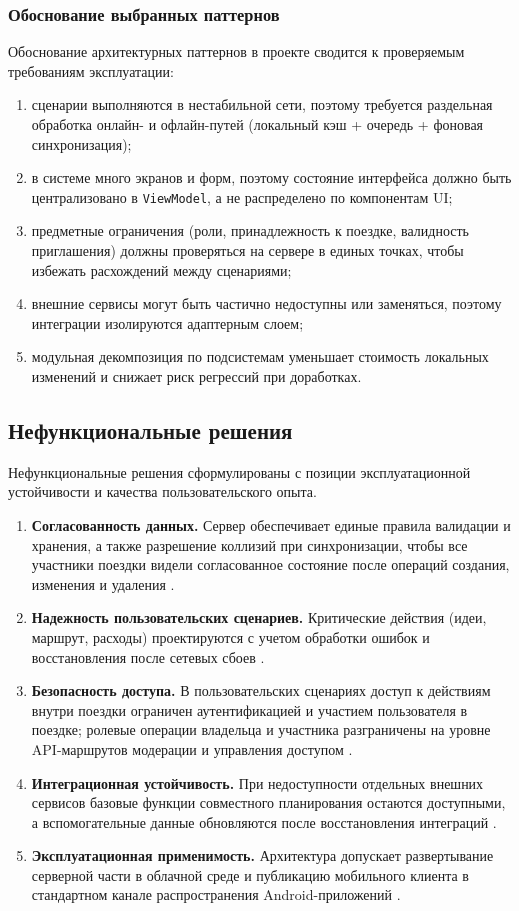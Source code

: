 \subsubsection{Обоснование выбранных паттернов}
Обоснование архитектурных паттернов в проекте сводится к проверяемым требованиям эксплуатации:
\begin{enumerate}
    \item сценарии выполняются в нестабильной сети, поэтому требуется раздельная обработка онлайн- и офлайн-путей (локальный кэш + очередь + фоновая синхронизация);
    \item в системе много экранов и форм, поэтому состояние интерфейса должно быть централизовано в \texttt{ViewModel}, а не распределено по компонентам UI;
    \item предметные ограничения (роли, принадлежность к поездке, валидность приглашения) должны проверяться на сервере в единых точках, чтобы избежать расхождений между сценариями;
    \item внешние сервисы могут быть частично недоступны или заменяться, поэтому интеграции изолируются адаптерным слоем;
    \item модульная декомпозиция по подсистемам уменьшает стоимость локальных изменений и снижает риск регрессий при доработках.
\end{enumerate}

\subsection{Нефункциональные решения}
Нефункциональные решения сформулированы с позиции эксплуатационной устойчивости и качества пользовательского опыта.

\begin{enumerate}
    \item \textbf{Согласованность данных.} Сервер обеспечивает единые правила валидации и хранения, а также разрешение коллизий при синхронизации, чтобы все участники поездки видели согласованное состояние после операций создания, изменения и удаления .
    \item \textbf{Надежность пользовательских сценариев.} Критические действия (идеи, маршрут, расходы) проектируются с учетом обработки ошибок и восстановления после сетевых сбоев .
    \item \textbf{Безопасность доступа.} В пользовательских сценариях доступ к действиям внутри поездки ограничен аутентификацией и участием пользователя в поездке; ролевые операции владельца и участника разграничены на уровне API-маршрутов модерации и управления доступом .
    \item \textbf{Интеграционная устойчивость.} При недоступности отдельных внешних сервисов базовые функции совместного планирования остаются доступными, а вспомогательные данные обновляются после восстановления интеграций .
    \item \textbf{Эксплуатационная применимость.} Архитектура допускает развертывание серверной части в облачной среде и публикацию мобильного клиента в стандартном канале распространения Android-приложений .
\end{enumerate}

